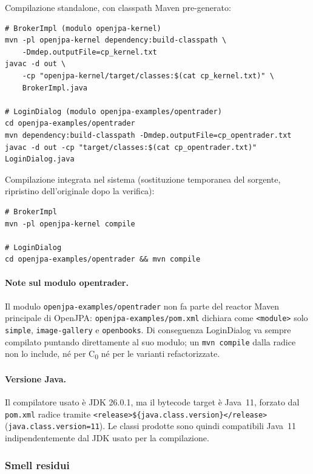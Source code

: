 Compilazione standalone, con classpath Maven pre-generato:

\begin{verbatim}
# BrokerImpl (modulo openjpa-kernel)
mvn -pl openjpa-kernel dependency:build-classpath \
    -Dmdep.outputFile=cp_kernel.txt
javac -d out \
    -cp "openjpa-kernel/target/classes:$(cat cp_kernel.txt)" \
    BrokerImpl.java

# LoginDialog (modulo openjpa-examples/opentrader)
cd openjpa-examples/opentrader
mvn dependency:build-classpath -Dmdep.outputFile=cp_opentrader.txt
javac -d out -cp "target/classes:$(cat cp_opentrader.txt)" LoginDialog.java
\end{verbatim}

Compilazione integrata nel sistema (sostituzione temporanea del sorgente, ripristino
dell'originale dopo la verifica):

\begin{verbatim}
# BrokerImpl
mvn -pl openjpa-kernel compile

# LoginDialog
cd openjpa-examples/opentrader && mvn compile
\end{verbatim}

\paragraph{Note sul modulo opentrader.}
Il modulo \texttt{openjpa-examples/opentrader} non fa parte del reactor Maven principale
di OpenJPA: \texttt{openjpa-examples/pom.xml} dichiara come \texttt{<module>} solo
\texttt{simple}, \texttt{image-gallery} e \texttt{openbooks}. Di conseguenza
LoginDialog va sempre compilato puntando direttamente al suo modulo; un
\texttt{mvn compile} dalla radice non lo include, né per C\textsubscript{0} né per le
varianti refactorizzate.

\paragraph{Versione Java.}
Il compilatore usato è JDK 26.0.1, ma il bytecode target è Java~11, forzato dal
\texttt{pom.xml} radice tramite \texttt{<release>\$\{java.class.version\}</release>}
(\texttt{java.class.version=11}). Le classi prodotte sono quindi compatibili
Java~11 indipendentemente dal JDK usato per la compilazione.

\subsubsection{Smell residui}

